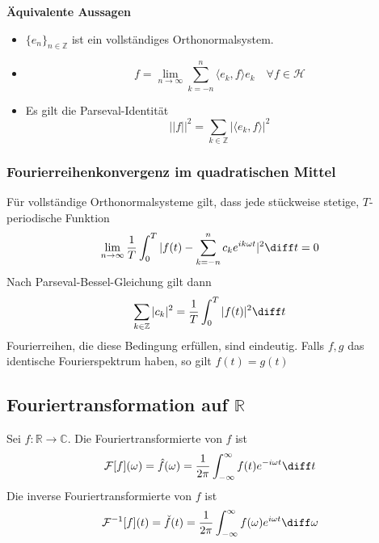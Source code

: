 \begin{sectionbox}
    \textbf{Äquivalente Aussagen}
    \begin{itemize}
        \item $\{e_n\}_{n\in\mathbb Z}$ ist ein vollständiges Orthonormalsystem.
        \item \begin{equation*}
                  f = \lim_{n\rightarrow\infty}\sum_{k=-n}^{n}\langle e_k, f\rangle e_k \quad \forall f \in \mathcal H
              \end{equation*}
        \item Es gilt die Parseval-Identität
              \begin{equation*}
                  ||f||^2 = \sum_{k\in\mathbb Z}|\langle e_k, f\rangle|^2
              \end{equation*}
    \end{itemize}
\end{sectionbox}

\begin{sectionbox}
    \subsubsection{Fourierreihenkonvergenz im quadratischen Mittel}
    Für vollständige Orthonormalsysteme gilt, dass jede stückweise stetige, $T$-periodische Funktion
    \begin{equation*}
        \lim_{n\rightarrow\infty}\frac{1}{T}\int_0^T|f(t) - \sum_{k=-n}^{n}c_ke^{ik\omega t}|^2\diff t = 0
    \end{equation*}
    Nach Parseval-Bessel-Gleichung gilt dann
    \begin{equation*}
        \sum_{k\in\mathbb Z}|c_k|^2 = \frac{1}{T}\int_0^T|f(t)|^2\diff t
    \end{equation*}
    Fourierreihen, die diese Bedingung erfüllen, sind eindeutig. Falls $f,g$ das identische Fourierspektrum haben, so gilt $f(t)=g(t)$
\end{sectionbox}


\subsection{Fouriertransformation auf $\mathbb R$}
\begin{emphbox}
    Sei $f: \mathbb R\rightarrow\mathbb C$. Die Fouriertransformierte von $f$ ist
    \begin{equation*}
        \mathcal F[f](\omega) = \hat f(\omega)=\frac{1}{2\pi}\int_{-\infty}^\infty f(t)e^{-i\omega t}\diff t
    \end{equation*}
    Die inverse Fouriertransformierte von $f$ ist
    \begin{equation*}
        \mathcal F^{-1}[f](t) = \check f(t)=\frac{1}{2\pi}\int_{-\infty}^\infty f(\omega)e^{i\omega t}\diff \omega
    \end{equation*}
\end{emphbox}

